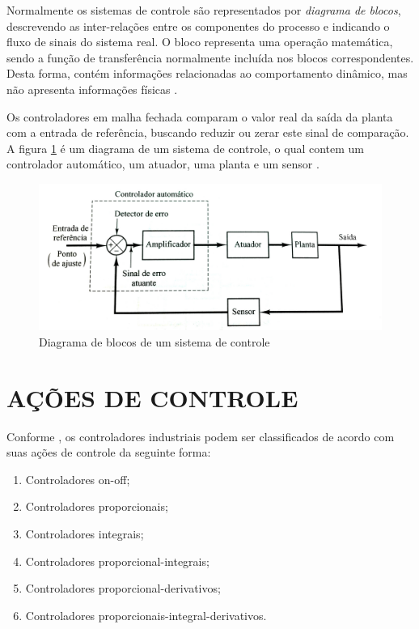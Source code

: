 \documentclass[12pt,oneside,a4paper, chapter=TITLE, section = TITLE, english, brazil]{abntex2}
\begin{document}
Normalmente os sistemas de controle são representados por \textit{diagrama de blocos}, descrevendo as inter-relações entre os componentes do processo e indicando o fluxo de sinais do sistema real. O bloco representa uma operação matemática, sendo a função de transferência normalmente incluída nos blocos correspondentes. Desta forma, contém informações relacionadas ao comportamento dinâmico, mas não apresenta informações físicas \cite{ogata}.

Os controladores em malha fechada comparam o valor real da saída da planta com a entrada de referência, buscando reduzir ou zerar este sinal de comparação. A figura \ref{fig:cont_autom} é um diagrama de um sistema de controle, o qual contem um controlador automático, um atuador, uma planta e um sensor \cite{ogata}.

\begin{figure}[h] %
\centering
\includegraphics[scale=0.24]{./imagens/cont_autom}
\caption[Diagrama de blocos de um sistema de controle]{Diagrama de blocos de um sistema de controle \cite{ogata}}
\label{fig:cont_autom}
\end{figure}


\section{AÇÕES DE CONTROLE}

Conforme , os controladores industriais podem ser classificados de acordo com suas ações de controle da seguinte forma:

\begin{enumerate}

\item Controladores on-off;

\item Controladores proporcionais;

\item Controladores integrais;

\item Controladores proporcional-integrais;

\item Controladores proporcional-derivativos;

\item Controladores proporcionais-integral-derivativos.

\end{enumerate}
\end{document}
